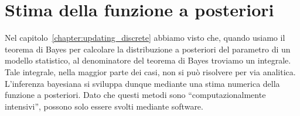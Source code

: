 \chapter{Stima della funzione a posteriori}
\label{chapter:stima_funzione_aposteriori} 



Nel capitolo~\ref{chapter:updating_discrete} abbiamo visto che, quando usiamo il teorema di Bayes per calcolare la distribuzione a posteriori del parametro di un modello statistico, al denominatore del teorema di Bayes troviamo un integrale.
Tale integrale, nella maggior parte dei casi, non si può risolvere per via analitica.
L'inferenza bayesiana si sviluppa dunque mediante una stima numerica della funzione a posteriori.
Dato che questi metodi sono \enquote{computazionalmente intensivi}, possono solo essere svolti mediante software. 
